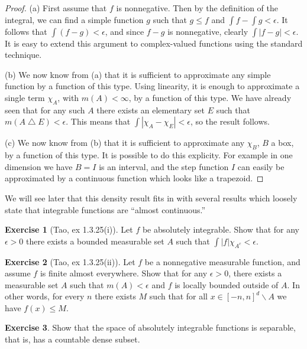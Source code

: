 \documentclass[10pt,oneside]{amsbook}
\renewcommand{\setminus}{\smallsetminus}
\renewcommand{\triangle}{\bigtriangleup}
\theoremstyle{definition}
\newtheorem{exerc}{Exercise}[section]
\theoremstyle{plain}
\theoremstyle{definition}
\theoremstyle{remark}
\numberwithin{equation}{section}
\numberwithin{figure}{section}
\begin{document}
\begin{proof}
  (a) First assume that $f$ is nonnegative. Then by the definition of the integral, we can find a simple function $g$ such that $g\leq f$ and $\int f-\int g<\epsilon$. It follows that $\int(f-g)<\epsilon$, and since $f-g$ is nonnegative, clearly $\int|f-g|<\epsilon$. It is easy to extend this argument to complex-valued functions using the standard technique.

  (b) We now know from (a) that it is sufficient to approximate any simple function by a function of this type. Using linearity, it is enough to approximate a single term $\chi_A$, with $m(A)<\infty$, by a function of this type. We have already seen that for any such $A$ there exists an elementary set $E$ such that $m(A\triangle E)<\epsilon$. This means that $\int|\chi_A-\chi_E|<\epsilon$, so the result follows.

  (c) We now know from (b) that it is sufficient to approximate any $\chi_B$, $B$ a box, by a function of this type. It is possible to do this explicity. For example in one dimension we have $B=I$ is an interval, and the step function $I$ can easily be approximated by a continuous function which looks like a trapezoid.
\end{proof}

We will see later that this density result fits in with several results which loosely state that integrable functions are ``almost continuous.''

\begin{exerc}[Tao, ex 1.3.25(i)]
  Let $f$ be absolutely integrable. Show that for any $\epsilon>0$ there exists a bounded measurable set $A$ such that $\int |f|\chi_{A^c}<\epsilon$.
\end{exerc}

\begin{exerc}[Tao, ex 1.3.25(ii)]
  Let $f$ be a nonnegative measurable function, and assume $f$ is finite almost everywhere. Show that for any $\epsilon>0$, there exists a measurable set $A$ such that $m(A)<\epsilon$ and $f$ is locally bounded outside of $A$. In other words, for every $n$ there exists $M$ such that for all $x\in[-n,n]^d\setminus A$ we have $f(x)\leq M$.
\end{exerc}

\begin{exerc}
  Show that the space of absolutely integrable functions is separable, that is, has a countable dense subset.
\end{exerc}

\newpage
\end{document}
